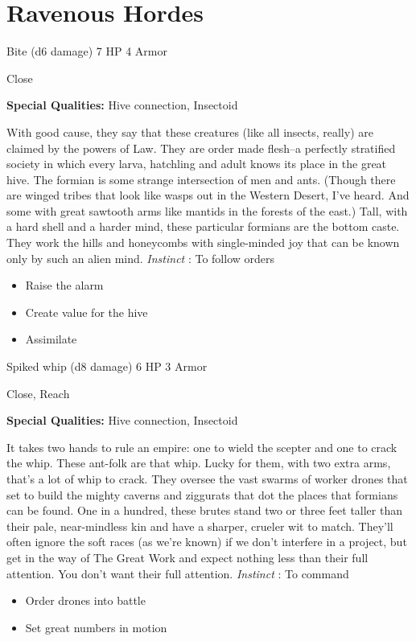 \section{Ravenous Hordes}




 Bite (d6 damage) 7 HP 4 Armor


 Close


 \textbf{Special Qualities:}
 Hive connection, Insectoid


 With good cause, they say that these creatures (like all insects, really) are claimed by the powers of Law. They are order made flesh--a perfectly stratified society in which every larva, hatchling and adult knows its place in the great hive. The formian is some strange intersection of men and ants. (Though there are winged tribes that look like wasps out in the Western Desert, I've heard. And some with great sawtooth arms like mantids in the forests of the east.) Tall, with a hard shell and a harder mind, these particular formians are the bottom caste. They work the hills and honeycombs with single-minded joy that can be known only by such an alien mind. \emph{Instinct}
: To follow orders
\begin{itemize}
\item Raise the alarm
\item Create value for the hive
\item Assimilate

\end{itemize}




 Spiked whip (d8 damage) 6 HP 3 Armor


 Close, Reach


 \textbf{Special Qualities:}
 Hive connection, Insectoid


 It takes two hands to rule an empire: one to wield the scepter and one to crack the whip. These ant-folk are that whip. Lucky for them, with two extra arms, that's a lot of whip to crack. They oversee the vast swarms of worker drones that set to build the mighty caverns and ziggurats that dot the places that formians can be found. One in a hundred, these brutes stand two or three feet taller than their pale, near-mindless kin and have a sharper, crueler wit to match. They'll often ignore the soft races (as we're known) if we don't interfere in a project, but get in the way of The Great Work and expect nothing less than their full attention. You don't want their full attention. \emph{Instinct}
: To command
\begin{itemize}
\item Order drones into battle
\item Set great numbers in motion

\end{itemize}


